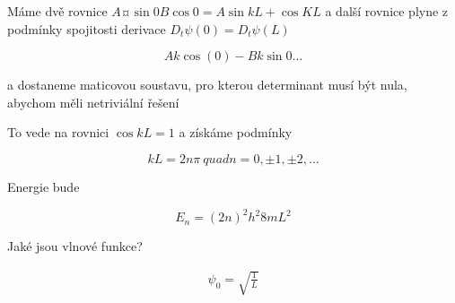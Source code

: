 Máme dvě rovnice $ A ¤\sin 0 B \cos 0 = A \sin kL +  \cos KL $ a další rovnice plyne z podmínky spojitosti derivace $ D_t \psi(0) = D_t \psi(L)$

$$
A k  \cos(0) - Bk\sin0 \ldots
$$

a dostaneme maticovou soustavu, pro kterou determinant musí být nula, abychom měli netriviální řešení

To vede na rovnici $\cos kL = 1$ a získáme podmínky 

$$
kL = 2n\pi\ quad n = 0, \pm 1, \pm 2, \ldots
$$

Energie bude 

$$
E_n = {(2n)^2 h^2}{8mL^2}
$$

Jaké jsou vlnové funkce?

$$
\begin{gather}
    \psi_0 = \sqrt{\frac{1}{L}}    
\end{gather}
$$
